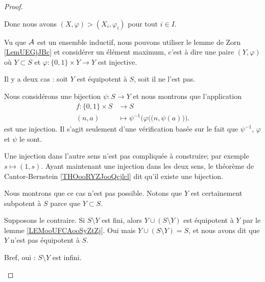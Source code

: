 \begin{proof}
\begin{subproof}
            Donc nous avons \( (X,\varphi)>(X_i,\varphi_i)\) pour tout \( i\in I\).

        \item[Lemme de Zorn]

            Vu que \( \mathcal{A}\) est un ensemble inductif, nous pouvons utiliser le lemme de Zorn \ref{LemUEGjJBc} et considérer un élément maximum, c'est à dire une paire \( (Y,\varphi)\) où \( Y\subset S\) et \( \varphi\colon \{ 0,1 \}\times Y\to Y\) est injective.

            Il y a deux cas : soit \( Y\) est équipotent à \( S\), soit il ne l'est pas.

        \item[Si \( Y\) est équipotent à \( S\)]

            Nous considérons une bijection \( \psi\colon S\to Y\) et nous montrons que l'application
            \begin{equation}
                \begin{aligned}
                    f\colon \{ 0,1 \}\times S&\to S \\
                    (n,a)&\mapsto \psi^{-1}\Big( \varphi\big( (n,\psi(a)\big) \Big) .
                \end{aligned}
            \end{equation}
            est une injection. Il s'agit seulement d'une vérification basée sur le fait que \( \psi^{-1}\), \( \varphi\) et \( \psi\) le sont.

            Une injection dans l'autre sens n'est pas compliquée à construire; par exemple \( s\mapsto (1,s)\). Ayant maintenant une injection dans les deux sens, le théorème de Cantor-Bernstein \ref{THOooRYZJooQcjlcl} dit qu'il existe une bijection.

        \item[Si \( Y\) n'est pas équipotent à \( S\)]

            Nous montrons que ce cas n'est pas possible. Notons que \( Y\) est certainement subpotent à \( S\) parce que \( Y\subset S\).
            \begin{subproof}
                \item[\( S\setminus Y\) est inifni]
                    Supposons le contraire. Si \( S\setminus Y\) est fini, alors \( Y\cup(S\setminus Y)\) est équipotent à \( Y\) par le lemme \ref{LEMooUFCAooSyZtZj}. Oui mais \( Y\cup(S\setminus Y)=S\), et nous avons dit que \( Y\) n'est pas équipotent à \( S\).

                    Bref, oui : \( S\setminus Y\) est infini.


\end{subproof}
\end{subproof}
\end{proof}
